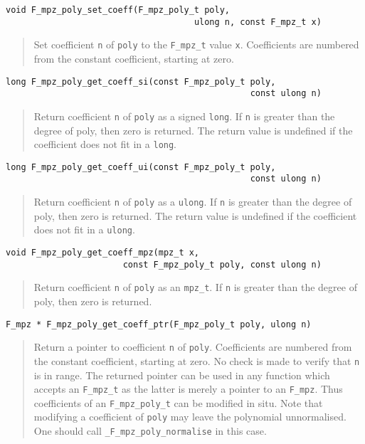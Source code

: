 \documentclass[a4paper,10pt]{article}
\newcommand{\code}{\lstinline}
\begin{document}
\begin{lstlisting}
void F_mpz_poly_set_coeff(F_mpz_poly_t poly, 
                                     ulong n, const F_mpz_t x)
\end{lstlisting}
\begin{quote}
Set coefficient \code{n} of \code{poly} to the \code{F_mpz_t} value \code{x}. Coefficients are 
numbered from the constant coefficient, starting at zero.
\end{quote}

\begin{lstlisting}
long F_mpz_poly_get_coeff_si(const F_mpz_poly_t poly, 
                                                const ulong n)
\end{lstlisting}
\begin{quote}
Return coefficient \code{n} of \code{poly} as a signed \code{long}. If \code{n} is greater than 
the degree of poly, then zero is returned. The return value is undefined if the coefficient does
not fit in a \code{long}.
\end{quote}

\begin{lstlisting}
long F_mpz_poly_get_coeff_ui(const F_mpz_poly_t poly, 
                                                const ulong n)
\end{lstlisting}
\begin{quote}
Return coefficient \code{n} of \code{poly} as a \code{ulong}. If \code{n} is greater than 
the degree of poly, then zero is returned. The return value is undefined if the coefficient does
not fit in a \code{ulong}.
\end{quote}

\begin{lstlisting}
void F_mpz_poly_get_coeff_mpz(mpz_t x, 
                       const F_mpz_poly_t poly, const ulong n)
\end{lstlisting}
\begin{quote}
Return coefficient \code{n} of \code{poly} as an \code{mpz_t}. If \code{n} is greater than 
the degree of poly, then zero is returned. 
\end{quote}

\begin{lstlisting}
F_mpz * F_mpz_poly_get_coeff_ptr(F_mpz_poly_t poly, ulong n)
\end{lstlisting}
\begin{quote}
Return a pointer to coefficient \code{n} of \code{poly}. Coefficients are numbered from the constant 
coefficient, starting at zero. No check is made to verify that \code{n} is in range. The returned 
pointer can be used in any function which accepts an \code{F_mpz_t} as the latter is merely a pointer
to an \code{F_mpz}. Thus coefficients of an \code{F_mpz_poly_t} can be modified in situ. Note that
modifying a coefficient of \code{poly} may leave the polynomial unnormalised. One should call 
\code{_F_mpz_poly_normalise} in this case.
\end{quote}
\end{document}
